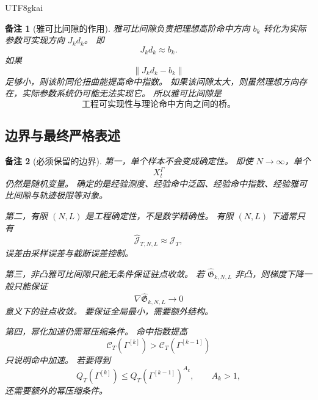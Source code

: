 \documentclass[12pt]{article}
\newtheorem{remark}{备注}[section]
\begin{document}
\begin{CJK*}{UTF8}{gkai}
\begin{remark}[雅可比间隙的作用]
雅可比间隙负责把理想高阶命中方向 \(b_k\) 转化为实际参数可实现方向 \(J_kd_k\)。
即
\[
  J_kd_k\approx b_k.
\]
如果
\[
  \lVert J_kd_k-b_k\rVert
\]
足够小，则该阶同伦扭曲能提高命中指数。
如果该间隙太大，则虽然理想方向存在，实际参数系统仍可能无法实现它。
所以雅可比间隙是
\[
  \boxed{
  \text{工程可实现性与理论命中方向之间的桥。}
  }
\]
\end{remark}

\subsection{边界与最终严格表述}
\label{subsec:tex55-engdet-boundary-final}

\begin{remark}[必须保留的边界]
第一，单个样本不会变成确定性。
即使 \(N\to\infty\)，单个
\[
  X_t^\Gamma
\]
仍然是随机变量。
确定的是经验测度、经验命中泛函、经验命中指数、经验雅可比间隙与轨迹极限等对象。

第二，有限 \((N,L)\) 是工程确定性，不是数学精确性。
有限 \((N,L)\) 下通常只有
\[
  \widehat{\mathcal J}_{T,N,L}\approx\mathcal J_T,
\]
误差由采样误差与截断误差控制。

第三，非凸雅可比间隙只能无条件保证驻点收敛。
若 \(\widehat{\mathfrak G}_{k,N,L}\) 非凸，则梯度下降一般只能保证
\[
  \nabla\widehat{\mathfrak G}_{k,N,L}\to0
\]
意义下的驻点收敛。
要保证全局最小，需要额外结构。

第四，幂化加速仍需幂压缩条件。
命中指数提高
\[
  \mathcal C_T(\Gamma^{[k]})
  >
  \mathcal C_T(\Gamma^{[k-1]})
\]
只说明命中加速。
若要得到
\[
  Q_T(\Gamma^{[k]})
  \le
  Q_T(\Gamma^{[k-1]})^{A_k},
  \qquad A_k>1,
\]
还需要额外的幂压缩条件。
\end{remark}


\end{CJK*}
\end{document}
